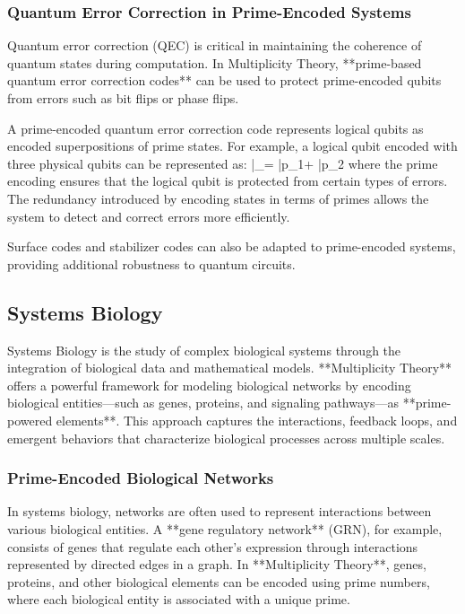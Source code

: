 \documentclass[12pt]{article}
\begin{document}
\subsubsection{Quantum Error Correction in Prime-Encoded Systems}

Quantum error correction (QEC) is critical in maintaining the coherence of quantum states during computation. In Multiplicity Theory, **prime-based quantum error correction codes** can be used to protect prime-encoded qubits from errors such as bit flips or phase flips.

A prime-encoded quantum error correction code represents logical qubits as encoded superpositions of prime states. For example, a logical qubit encoded with three physical qubits can be represented as:
\]
|\psi_{}\rangle = \alpha |p_1\rangle + \beta |p_2\rangle
\]
where the prime encoding ensures that the logical qubit is protected from certain types of errors. The redundancy introduced by encoding states in terms of primes allows the system to detect and correct errors more efficiently.

Surface codes and stabilizer codes can also be adapted to prime-encoded systems, providing additional robustness to quantum circuits.


\subsection{Systems Biology}

Systems Biology is the study of complex biological systems through the integration of biological data and mathematical models. **Multiplicity Theory** offers a powerful framework for modeling biological networks by encoding biological entities—such as genes, proteins, and signaling pathways—as **prime-powered elements**. This approach captures the interactions, feedback loops, and emergent behaviors that characterize biological processes across multiple scales.

\subsubsection{Prime-Encoded Biological Networks}

In systems biology, networks are often used to represent interactions between various biological entities. A **gene regulatory network** (GRN), for example, consists of genes that regulate each other’s expression through interactions represented by directed edges in a graph. In **Multiplicity Theory**, genes, proteins, and other biological elements can be encoded using prime numbers, where each biological entity is associated with a unique prime.
\end{document}
